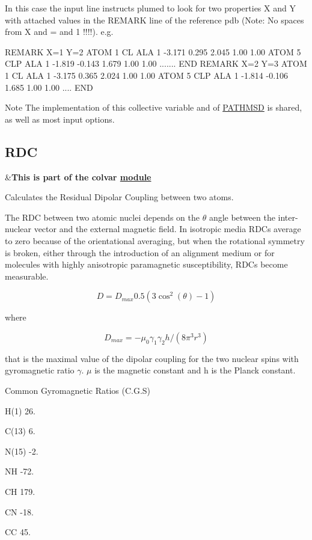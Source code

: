 In this case the input line instructs plumed to look for two properties X and Y with attached values in the R\+E\+M\+A\+R\+K line of the reference pdb (Note\+: No spaces from X and = and 1 !!!!). e.\+g.

\begin{DoxyVerb}REMARK X=1 Y=2 
ATOM      1  CL  ALA     1      -3.171   0.295   2.045  1.00  1.00
ATOM      5  CLP ALA     1      -1.819  -0.143   1.679  1.00  1.00
.......
END
REMARK X=2 Y=3 
ATOM      1  CL  ALA     1      -3.175   0.365   2.024  1.00  1.00
ATOM      5  CLP ALA     1      -1.814  -0.106   1.685  1.00  1.00
....
END
\end{DoxyVerb}


\begin{DoxyNote}{Note}
The implementation of this collective variable and of \hyperlink{PATHMSD}{P\+A\+T\+H\+M\+S\+D} is shared, as well as most input options. 
\end{DoxyNote}
\hypertarget{RDC}{}\subsection{R\+D\+C}\label{RDC}
\begin{TabularC}{2}
\hline
&{\bfseries  This is part of the colvar \hyperlink{mymodules}{module }}   \\
\end{TabularC}
Calculates the Residual Dipolar Coupling between two atoms.

The R\+D\+C between two atomic nuclei depends on the $\theta$ angle between the inter-\/nuclear vector and the external magnetic field. In isotropic media R\+D\+Cs average to zero because of the orientational averaging, but when the rotational symmetry is broken, either through the introduction of an alignment medium or for molecules with highly anisotropic paramagnetic susceptibility, R\+D\+Cs become measurable.

\[ D=D_{max}0.5(3\cos^2(\theta)-1) \]

where

\[ D_{max}=-\mu_0\gamma_1\gamma_2h/(8\pi^3r^3) \]

that is the maximal value of the dipolar coupling for the two nuclear spins with gyromagnetic ratio $\gamma$. $\mu$ is the magnetic constant and h is the Planck constant.

Common Gyromagnetic Ratios (C.\+G.\+S)
\begin{DoxyItemize}
\item H(1) 26.
\item C(13) 6.
\item N(15) -\/2.
\item N\+H -\/72.
\item C\+H 179.
\item C\+N -\/18.
\item C\+C 45.
\end{DoxyItemize}

